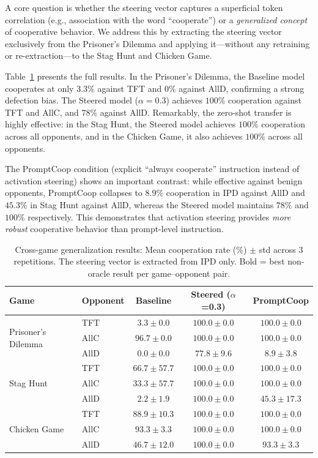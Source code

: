 \documentclass{article}
\begin{document}
A core question is whether the steering vector captures a superficial token correlation (e.g., association with the word ``cooperate'') or a \textit{generalized concept} of cooperative behavior. We address this by extracting the steering vector exclusively from the Prisoner's Dilemma and applying it---without any retraining or re-extraction---to the Stag Hunt and Chicken Game.

Table~\ref{tab:cross_game} presents the full results. In the Prisoner's Dilemma, the Baseline model cooperates at only $3.3\%$ against TFT and $0\%$ against AllD, confirming a strong defection bias. The Steered model ($\alpha = 0.3$) achieves $100\%$ cooperation against TFT and AllC, and $78\%$ against AllD. Remarkably, the zero-shot transfer is highly effective: in the Stag Hunt, the Steered model achieves $100\%$ cooperation across all opponents, and in the Chicken Game, it also achieves $100\%$ across all opponents.

The PromptCoop condition (explicit ``always cooperate'' instruction instead of activation steering) shows an important contrast: while effective against benign opponents, PromptCoop collapses to $8.9\%$ cooperation in IPD against AllD and $45.3\%$ in Stag Hunt against AllD, whereas the Steered model maintains $78\%$ and $100\%$ respectively. This demonstrates that activation steering provides \textit{more robust} cooperative behavior than prompt-level instruction.

\begin{table}[t]
\centering
\caption{Cross-game generalization results: Mean cooperation rate (\%) $\pm$ std across 3 repetitions. The steering vector is extracted from IPD only. Bold = best non-oracle result per game--opponent pair.}
\label{tab:cross_game}
\small
\begin{tabular}{llccc}
\toprule
\textbf{Game} & \textbf{Opponent} & \textbf{Baseline} & \textbf{Steered ($\alpha$=0.3)} & \textbf{PromptCoop} \\
\midrule
\multirow{3}{*}{Prisoner's Dilemma}
  & TFT  & $3.3 \pm 0.0$ & $\mathbf{100.0 \pm 0.0}$ & $100.0 \pm 0.0$ \\
  & AllC & $96.7 \pm 0.0$ & $\mathbf{100.0 \pm 0.0}$ & $100.0 \pm 0.0$ \\
  & AllD & $0.0 \pm 0.0$ & $\mathbf{77.8 \pm 9.6}$ & $8.9 \pm 3.8$ \\
\midrule
\multirow{3}{*}{Stag Hunt}
  & TFT  & $66.7 \pm 57.7$ & $\mathbf{100.0 \pm 0.0}$ & $100.0 \pm 0.0$ \\
  & AllC & $33.3 \pm 57.7$ & $\mathbf{100.0 \pm 0.0}$ & $100.0 \pm 0.0$ \\
  & AllD & $2.2 \pm 1.9$ & $\mathbf{100.0 \pm 0.0}$ & $45.3 \pm 17.3$ \\
\midrule
\multirow{3}{*}{Chicken Game}
  & TFT  & $88.9 \pm 10.3$ & $\mathbf{100.0 \pm 0.0}$ & $100.0 \pm 0.0$ \\
  & AllC & $93.3 \pm 3.3$ & $\mathbf{100.0 \pm 0.0}$ & $100.0 \pm 0.0$ \\
  & AllD & $46.7 \pm 12.0$ & $\mathbf{100.0 \pm 0.0}$ & $93.3 \pm 3.3$ \\
\bottomrule
\end{tabular}
\end{table}
\end{document}
